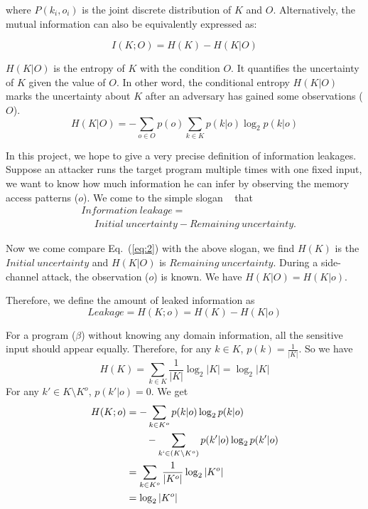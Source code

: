 where $P(k_i, o_i)$ is the joint discrete distribution of $K$ and $O$.
Alternatively, the mutual information can also be equivalently expressed as:

\begin{equation} \label{eq:2}
    I(K;O) = H(K) - H(K|O)
\end{equation}

$H(K|O)$ is the entropy of $K$ with the condition $O$. It quantifies the
uncertainty of $K$ given the value of $O$. In other word, the conditional
entropy $H(K|O)$ marks the uncertainty about $K$ after an adversary has gained
some observations ($O$).
\begin{equation}
    H(K|O) = - \sum_{o {\in} O} {p(o) \sum_{k {\in} K}{p(k|o)\log_2p(k|o)}}
\end{equation}

In this project, we hope to give a very precise definition of information
leakages. Suppose an attacker runs the target program multiple times with one
fixed input, we want to know how much information he can infer by observing the
memory access patterns ($o$). We come to the simple slogan
~\cite{10.1007/978-3-642-00596-1_21} %
that
\begin{align*}
     & \mathit{Information\ leakage} =                                         \\
     & ~~~~~~ \mathit{Initial\ uncertainty} - \mathit{Remaining\ uncertainty}.
\end{align*}

Now we come compare Eq.~(\ref{eq:2}) with the above slogan, we find $H(K)$
is the $\mathit{Initial\ uncertainty}$ and $H(K|O)$ is $\mathit{Remaining\
uncertainty}$. During a side-channel attack, the observation ($o$) is known.  We
have $H(K|O) = H(K|o)$.

Therefore, we define the amount of leaked information as
\begin{displaymath}
    Leakage = H(K;o) = H(K) - H(K|o)
\end{displaymath}

For a program ($\beta$) without knowing any domain information, all the sensitive
input should appear equally. Therefore, for any $k \in K$, $p(k) =
\frac{1}{|K|}$. So we have
$$H(K) = \sum_{k {\in} K}\frac{1}{|K|}\log_2{|K|} = \log_2{|K|}$$
For any $k' \in K \setminus K^o$, $p(k'|o) = 0$. We get
\begin{align*}
    H(K;o) & = - \sum_{k {\in} K^o}{p(k|o)\log_2p(k|o)}                         \\
           & \qquad   - \sum_{k` {\in} (K \setminus K^o)}{p(k'|o)\log_2p(k'|o)} \\
           & = \sum_{k {\in} K^o}\frac{1}{|K^o|}\log_2{|K^o|}                   \\
           & = \log_2{|K^o|}
\end{align*}


